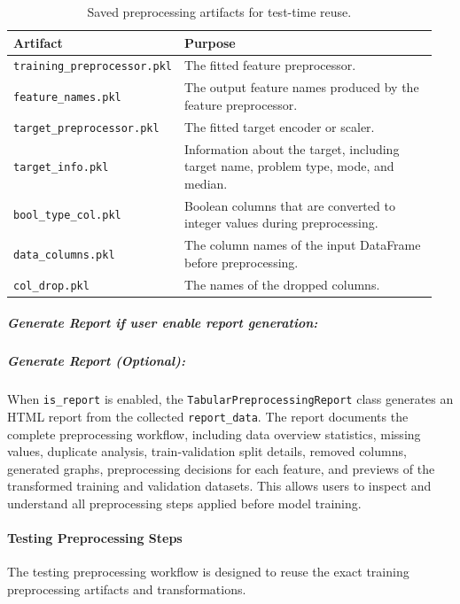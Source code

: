 \begin{table}[H]
\centering
\caption{Saved preprocessing artifacts for test-time reuse.}
\begin{tabular}{p{0.30\linewidth}p{0.65\linewidth}}
\toprule
\textbf{Artifact} & \textbf{Purpose}\\
\midrule
\texttt{training\_preprocessor.pkl} & The fitted feature preprocessor.\\
\texttt{feature\_names.pkl} & The output feature names produced by the feature preprocessor.\\
\texttt{target\_preprocessor.pkl} & The fitted target encoder or scaler.\\
\texttt{target\_info.pkl} & Information about the target, including target name, problem type, mode, and median.\\
\texttt{bool\_type\_col.pkl} & Boolean columns that are converted to integer values during preprocessing.\\
\texttt{data\_columns.pkl} & The column names of the input DataFrame before preprocessing.\\
\texttt{col\_drop.pkl} & The names of the dropped columns.\\
\bottomrule
\end{tabular}
\end{table}
\subparagraph{Generate Report if user enable report generation:}
\subparagraph{Generate Report (Optional):}
When \texttt{is\_report} is enabled, the \texttt{TabularPreprocessingReport} class generates an HTML report from the collected \texttt{report\_data}. The report documents the complete preprocessing workflow, including data overview statistics, missing values, duplicate analysis, train-validation split details, removed columns, generated graphs, preprocessing decisions for each feature, and previews of the transformed training and validation datasets. This allows users to inspect and understand all preprocessing steps applied before model training.
\paragraph{Testing Preprocessing Steps}
The testing preprocessing workflow is designed to reuse the exact training preprocessing artifacts and transformations.


